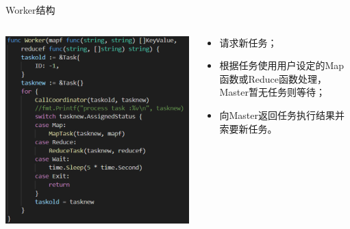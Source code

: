 \begin{frame}{\begin{CJK}{UTF8}{gkai}
			Worker结构
	\end{CJK}}
	
	\begin{columns}
		
		\begin{column}{0.5\textwidth}
			\centerline{\includegraphics[width = 1.0\textwidth]{Figures/worker.png}}
		\end{column}
		\begin{column}{0.5\textwidth}
			\begin{itemize}
				\item \begin{CJK}{UTF8}{gkai}
					请求新任务；
				\end{CJK}
				
				\item \begin{CJK}{UTF8}{gkai}
					根据任务使用用户设定的Map函数或Reduce函数处理，Master暂无任务则等待；
				\end{CJK}
				
				\item \begin{CJK}{UTF8}{gkai}
					向Master返回任务执行结果并索要新任务。
				\end{CJK}	
				
			\end{itemize}
		\end{column}
		
		
	\end{columns}
	
\end{frame}

